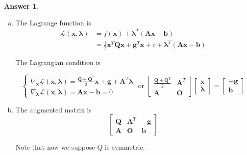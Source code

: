 \documentclass{article}
\theoremstyle{definition}
\newtheorem{ans}{Answer}
\begin{document}
	\begin{ans}
		~
		
		\begin{enumerate}[(a)]
			\item The Lagrange function is 	
			$$
			\begin{aligned}
				\mathcal{L}(\boldsymbol{x}, \boldsymbol{\lambda})&=f(\boldsymbol{x})+\boldsymbol{\lambda}^T(\boldsymbol{A} \boldsymbol{x}-\boldsymbol{b})\\
				&=\frac{1}{2} \boldsymbol{x}^{T} \boldsymbol{Q} \boldsymbol{x}+\boldsymbol{g}^{T} \boldsymbol{x}+c+\boldsymbol{\lambda}^T(\boldsymbol{A} \boldsymbol{x}-\boldsymbol{b})
			\end{aligned}
			$$
	
			The Lagrangian condition is
	
			$$
			\left\{\begin{array}{l}
				\nabla_{\boldsymbol{x}} \mathcal{L}\left(\boldsymbol{x}, \boldsymbol{\lambda}\right)=\frac{\boldsymbol{Q}+\boldsymbol{Q}^T}{2}\boldsymbol{x}+\boldsymbol g + \boldsymbol{A}^T\boldsymbol{\lambda}\\
				\nabla_{\boldsymbol{\lambda}} \mathcal{L}\left(\boldsymbol{x}, \boldsymbol{\lambda}\right)=\boldsymbol{A} \boldsymbol{x}-\boldsymbol{b}=0
			\end{array}\right.\text{ or }
			\left[\begin{array}{cc}
				\frac{\boldsymbol{Q}+\boldsymbol{Q}^T}{2} & \boldsymbol{A}^T\\
				\boldsymbol{A} & \boldsymbol{O}
			\end{array}\right]
			\left[\begin{array}{c}
				\boldsymbol{x} \\
				\boldsymbol{\lambda}
			\end{array}\right]
			=
			\left[\begin{array}{c}
				-\boldsymbol{g} \\
				\boldsymbol{b}
			\end{array}\right]
			$$
			
			\item The augmented matrix is 
			$$
			\left[\begin{array}{ccc}
				\boldsymbol{Q} & \boldsymbol{A}^T & -\boldsymbol{g} \\
				\boldsymbol{A} & \boldsymbol{O} & \boldsymbol{b}
			\end{array}\right]
			$$
			
			Note that now we suppose $Q$ is symmetric. 
			

\end{enumerate}
\end{ans}
\end{document}
